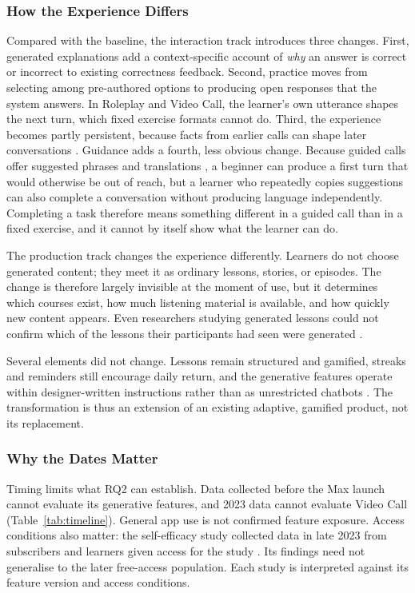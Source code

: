 \documentclass[11pt,titlepage]{article}
\begin{document}
\subsubsection{How the Experience Differs}
Compared with the baseline, the interaction track introduces three changes. First, generated explanations add a context-specific account of \emph{why} an answer is correct or incorrect to existing correctness feedback. Second, practice moves from selecting among pre-authored options to producing open responses that the system answers. In Roleplay and Video Call, the learner's own utterance shapes the next turn, which fixed exercise formats cannot do. Third, the experience becomes partly persistent, because facts from earlier calls can shape later conversations \parencite{henry2025}. Guidance adds a fourth, less obvious change. Because guided calls offer suggested phrases and translations \parencite{falstaff}, a beginner can produce a first turn that would otherwise be out of reach, but a learner who repeatedly copies suggestions can also complete a conversation without producing language independently. Completing a task therefore means something different in a guided call than in a fixed exercise, and it cannot by itself show what the learner can do.

The production track changes the experience differently. Learners do not choose generated content; they meet it as ordinary lessons, stories, or episodes. The change is therefore largely invisible at the moment of use, but it determines which courses exist, how much listening material is available, and how quickly new content appears. Even researchers studying generated lessons could not confirm which of the lessons their participants had seen were generated \parencite{catalan2026}.

Several elements did not change. Lessons remain structured and gamified, streaks and reminders still encourage daily return, and the generative features operate within designer-written instructions rather than as unrestricted chatbots \parencite{roleplayDesign,henry2025}. The transformation is thus an extension of an existing adaptive, gamified product, not its replacement.

\subsubsection{Why the Dates Matter}
Timing limits what RQ2 can establish. Data collected before the Max launch cannot evaluate its generative features, and 2023 data cannot evaluate Video Call (Table~\ref{tab:timeline}). General app use is not confirmed feature exposure. Access conditions also matter: the self-efficacy study collected data in late 2023 from subscribers and learners given access for the study \parencite{kittredge2025self}. Its findings need not generalise to the later free-access population. Each study is interpreted against its feature version and access conditions.
\end{document}
